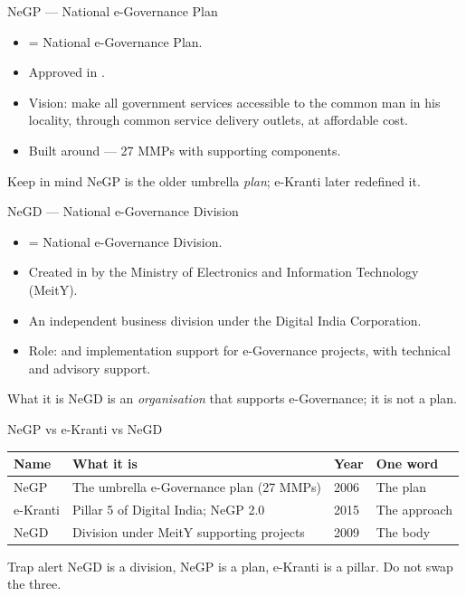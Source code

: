 \documentclass[aspectratio=169]{beamer}
\begin{document}
\begin{frame}{NeGP --- National e-Governance Plan}
  \begin{itemize}
    \item {} = National e-Governance Plan.
    \item Approved in .
    \item Vision: make all government services accessible to the common man
      in his locality, through common service delivery outlets, at affordable
      cost.
    \item Built around  --- 27 MMPs with
      supporting components.
  \end{itemize}
  \begin{block}{Keep in mind}
    NeGP is the older umbrella \emph{plan}; e-Kranti later redefined it.
  \end{block}
\end{frame}

\begin{frame}{NeGD --- National e-Governance Division}
  \begin{itemize}
    \item {} = National e-Governance Division.
    \item Created in  by the Ministry of Electronics and
      Information Technology (MeitY).
    \item An independent business division under the Digital India
      Corporation.
    \item Role:  and implementation support for
      e-Governance projects, with technical and advisory support.
  \end{itemize}
  \begin{block}{What it is}
    NeGD is an \emph{organisation} that supports e-Governance; it is not a
    plan.
  \end{block}
\end{frame}

\begin{frame}{NeGP vs e-Kranti vs NeGD}
  \begin{center}
    \begin{tabular}{p{}p{}p{}p{}}
      \toprule
      \textbf{Name} & \textbf{What it is} & \textbf{Year} & \textbf{One word} \\
      \midrule
      NeGP & The umbrella e-Governance plan (27 MMPs) & 2006 & The plan \\
      e-Kranti & Pillar 5 of Digital India; NeGP 2.0 & 2015 & The approach \\
      NeGD & Division under MeitY supporting projects & 2009 & The body \\
      \bottomrule
    \end{tabular}
  \end{center}
  \vspace{0.3cm}
  \begin{alertblock}{Trap alert}
    NeGD is a division, NeGP is a plan, e-Kranti is a pillar. Do not swap the
    three.
  \end{alertblock}
\end{frame}
\end{document}
